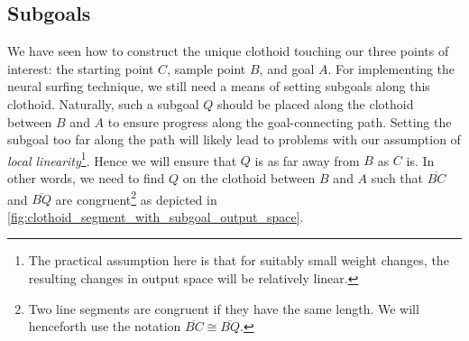 \subsection{Subgoals}
\label{sec:clothoid_subgoals}
We have seen how to construct the unique clothoid touching our three points of interest: the starting point $C$, sample point $B$, and goal $A$. 
For implementing the neural surfing technique, we still need a means of setting subgoals along this clothoid. 
Naturally, such a subgoal $Q$ should be placed along the clothoid between $B$ and $A$ to ensure progress along the goal-connecting path.
Setting the subgoal too far along the path will likely lead to problems with our assumption of \textit{local linearity}\footnote{The practical assumption here is that for suitably small weight changes, the resulting changes in output space will be relatively linear.}.
Hence we will ensure that $Q$ is as far away from $B$ as $C$ is. 
In other words, we need to find $Q$ on the clothoid between $B$ and $A$ such that $\overline{BC}$ and $\overline{BQ}$ are congruent\footnote{Two line segments are congruent if they have the same length. We will henceforth use the notation $\overline{BC} \cong \overline{BQ}$.} as depicted in \ref{fig:clothoid_segment_with_subgoal_output_space}.
